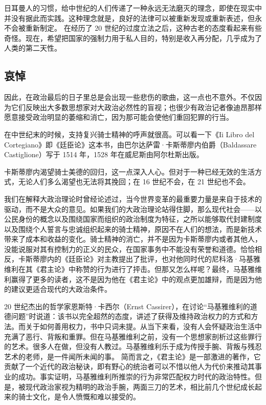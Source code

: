 日耳曼人的习惯，给中世纪的人们传递了一种永远无法磨灭的理念，即使在现实中并没有据此而实践。这种理念就是，良好的法律可以被重新发现或重新表述，但永不会被重新制定。 在经历了 20 世纪的过度立法之后，这种古老的态度看起来有些奇怪。现在，希望把国家的强制力用于私人目的，特别是收入再分配，几乎成为了人类的第二天性。

\subsection{哀悼}
因此，在政治最后的日子里总是会出现一些悲伤的歌曲，这一点也不意外。不仅因为它们反映出大多数思想家对大政治必然性的盲视；也很少有政治记者像迪昂那样愿意接受政治明显的萎缩和消亡，因为那可能会使他们重回犯罪的行当。

在中世纪末的时候，支持复兴骑士精神的呼声就很高。可以看一下《Ii Libro del Cortegiano》即《廷臣论》这本书，由巴尔达萨雷·卡斯蒂廖内伯爵（Baldassare Castiglione）写于 1514 年，1528 年在威尼斯由阿尔杜斯出版。

卡斯蒂廖内渴望骑士美德的回归，这一点深入人心。但对于一种已经无效的生活方式，无论人们多么渴望也无法将其挽回；在 16 世纪不会，在 21 世纪也不会。

我们在解释大政治理论时曾经论述过，当今世界变革的最重要力量是来自于技术的驱动，而不是大众的意见。如果我们的大政治理论站得住脚，那么现代社会——以公民身份的概念以及围绕国家而组织的政治制度为特征，之所以能够取代封建制度以及围绕个人誓言与忠诚组织起来的骑士精神，原因不在人们的想法，而是新技术带来了成本和收益的变化。骑士精神的消亡，并不是因为卡斯蒂廖内或者其他人，没能说服对其有控制力的正义的民众，在国家事务中不能没有荣誉和道德。恰恰相反，卡斯蒂廖内的《廷臣论》对主教提出了批评，也对他同时代的尼科洛·马基雅维利在其《君主论》中称赞的行为进行了抨击。但那又怎么样呢？最终，马基雅维利赢得了更多的读者，这不是因为他在《君主论》中的观点更加雄辩，而是因为他的建议更适合现代的大政治条件。

20 世纪杰出的哲学家恩斯特·卡西尔（Ernst Cassirer），在讨论“马基雅维利的道德问题”时说道：该书以完全超然的态度，讲述了获得及维持政治权力的方式和方法。而关于如何善用权力，书中只词未提。从当下来看，没有人会怀疑政治生活中充满了恶行、背叛和重罪。但在马基雅维利之前，没有一个思想家剖析过这些罪行的艺术。很多人在做，但没有人教过。马基雅维利乐于成为传授手腕、背叛与残忍艺术的老师，是一件闻所未闻的事。 简而言之，《君主论》是一部激进的著作，它贡献了一个近代的政治秘诀，即有野心的统治者可以不惜以他人为代价来推动其事业的成功。事实证明，马基雅维利所推崇的行为非常匹配权力时代的政治特性。但是，被现代政治家视为精明的政治手腕，两面三刀的艺术，相比前几个世纪成长起来的骑士文化，是令人愤慨和难以接受的。

